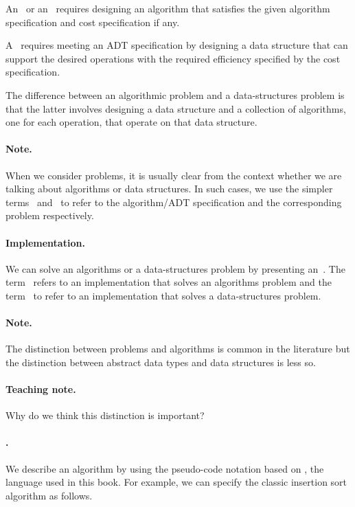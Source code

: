 An~ or an~
requires designing an algorithm that satisfies the given algorithm
specification and cost specification if any.
%

A~ requires meeting an ADT
specification by designing a data structure that can
support the desired operations with the required efficiency specified
by the cost specification.
%

The difference between an algorithmic problem and a data-structures
problem is that the latter involves designing a data structure and a
collection of algorithms, one for each operation, that operate on that
data structure.

\paragraph{Note.}
When we consider problems, it is usually clear from the context
whether we are talking about algorithms or data structures.
%
In such cases, we use the simpler terms~
and~ to refer to the algorithm/ADT specification and the
corresponding problem respectively.

\paragraph{Implementation.}
We can solve an algorithms or a data-structures problem by presenting
an~.  
%
The term~ refers to an implementation that solves an
algorithms problem and the term~ to
refer to an implementation that solves a data-structures problem.

\paragraph{Note.}
The distinction between problems and algorithms is common in the
literature but the distinction between abstract data types and data
structures is less so.

\paragraph{Teaching note.}
Why do we think this distinction is important?

\paragraph{.}
We describe an algorithm by using the pseudo-code notation based on
\pml, the language  used in this book.  For example, we can specify
the classic insertion sort algorithm as follows.
%

